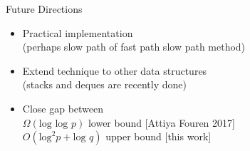 \documentclass[compress]{beamer}
\renewcommand{\log}{\mbox{log }} %
\begin{document}
\begin{frame}{Future Directions}

\begin{itemize}
\item
Practical implementation\\
(perhaps slow path of fast path slow path method)
\item
Extend technique to other data structures\\
 (stacks and deques are recently done)
 \item
Close gap between\\
$\Omega(\log \log p)$ lower bound \hfill {\small [Attiya Fouren 2017]}\\
$O(\mbox{log}^2 p + \log q)$ upper bound \hfill {\small [this work]}

\end{itemize}

\end{frame}
\end{document}
